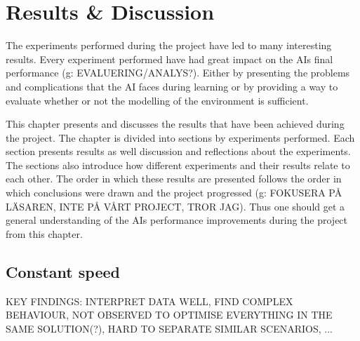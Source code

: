 

\chapter{Results \& Discussion}
The experiments performed during the project have led to many interesting results. Every experiment performed have had great impact on the AIs final performance (g: EVALUERING/ANALYS?). Either by presenting the problems and complications that the AI faces during learning or by providing a way to evaluate whether or not the modelling of the environment is sufficient.

This chapter presents and discusses the results that have been achieved during the project. The chapter is divided into sections by experiments performed. Each section presents results as well discussion and reflections about the experiments. The sections also introduce how different experiments and their results relate to each other. The order in which these results are presented follows the order in which conclusions were drawn and the project progressed (g: FOKUSERA PÅ LÄSAREN, INTE PÅ VÅRT PROJECT, TROR JAG). Thus one should get a general understanding of the AIs performance improvements during the project from this chapter.


\section{Constant speed}

KEY FINDINGS: INTERPRET DATA WELL, FIND COMPLEX BEHAVIOUR, NOT OBSERVED TO OPTIMISE EVERYTHING IN THE SAME SOLUTION(?), HARD TO SEPARATE SIMILAR SCENARIOS, ...

